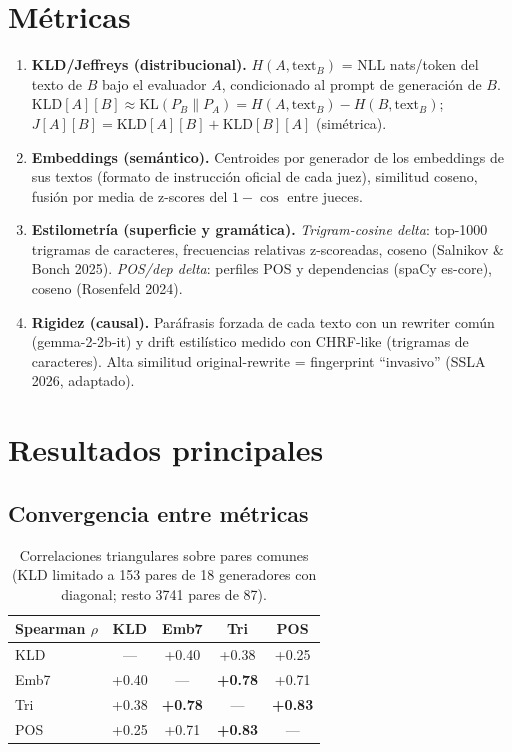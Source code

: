 \documentclass[11pt,a4paper]{article}
\begin{document}
\section{Métricas}
\begin{enumerate}
\item \textbf{KLD/Jeffreys (distribucional).} $H(A,\text{text}_B)$ = NLL nats/token del
texto de $B$ bajo el evaluador $A$, condicionado al prompt de generación de $B$.
$\mathrm{KLD}[A][B] \approx \mathrm{KL}(P_B \| P_A) = H(A,\text{text}_B)-H(B,\text{text}_B)$;
$J[A][B]=\mathrm{KLD}[A][B]+\mathrm{KLD}[B][A]$ (simétrica).
\item \textbf{Embeddings (semántico).} Centroides por generador de los embeddings de
sus textos (formato de instrucción oficial de cada juez), similitud coseno,
fusión por media de z-scores del $1-\cos$ entre jueces.
\item \textbf{Estilometría (superficie y gramática).} \emph{Trigram-cosine delta}: top-1000
trigramas de caracteres, frecuencias relativas z-scoreadas, coseno (Salnikov \& Bonch 2025).
\emph{POS/dep delta}: perfiles POS y dependencias (spaCy es-core), coseno (Rosenfeld 2024).
\item \textbf{Rigidez (causal).} Paráfrasis forzada de cada texto con un rewriter común
(gemma-2-2b-it) y drift estilístico medido con CHRF-like (trigramas de caracteres).
Alta similitud original-rewrite = fingerprint ``invasivo'' (SSLA 2026, adaptado).
\end{enumerate}

\section{Resultados principales}
\subsection{Convergencia entre métricas}
\begin{table}[h]\centering
\begin{tabular}{lcccc}
\toprule
Spearman $\rho$ & KLD & Emb7 & Tri & POS\\
\midrule
KLD & --- & +0.40 & +0.38 & +0.25\\
Emb7 & +0.40 & --- & \textbf{+0.78} & +0.71\\
Tri & +0.38 & \textbf{+0.78} & --- & \textbf{+0.83}\\
POS & +0.25 & +0.71 & \textbf{+0.83} & ---\\
\bottomrule
\end{tabular}
\caption{Correlaciones triangulares sobre pares comunes (KLD limitado a 153 pares
de 18 generadores con diagonal; resto 3741 pares de 87).}
\end{table}
\end{document}

